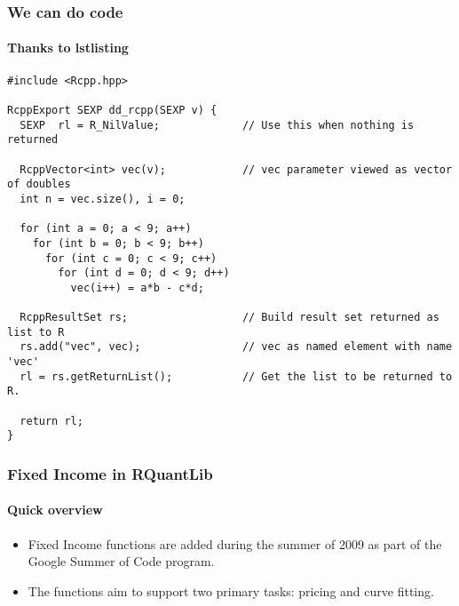 \documentclass[smaller,compress]{beamer}
\begin{document}
\begin{frame}[fragile]  %
  \frametitle{We can do code}
  \framesubtitle{Thanks to lstlisting}

\lstset{language=C++,basicstyle=\tiny}
\begin{lstlisting}
#include <Rcpp.hpp>

RcppExport SEXP dd_rcpp(SEXP v) {
  SEXP  rl = R_NilValue;             // Use this when nothing is returned

  RcppVector<int> vec(v);            // vec parameter viewed as vector of doubles
  int n = vec.size(), i = 0;

  for (int a = 0; a < 9; a++)
    for (int b = 0; b < 9; b++)
      for (int c = 0; c < 9; c++)
        for (int d = 0; d < 9; d++)
          vec(i++) = a*b - c*d;

  RcppResultSet rs;                  // Build result set returned as list to R
  rs.add("vec", vec);                // vec as named element with name 'vec'
  rl = rs.getReturnList();           // Get the list to be returned to R.

  return rl;
}
\end{lstlisting}


\end{frame}

\begin{frame}
	\frametitle{Fixed Income in RQuantLib}
	\framesubtitle{Quick overview}
	\begin{itemize}
		\item Fixed Income functions are added during the summer of 2009 as part of the Google Summer of 	Code program.
		\item The functions aim to support two primary tasks: pricing and curve fitting. 		
	\end{itemize}
\end{frame}
\end{document}

